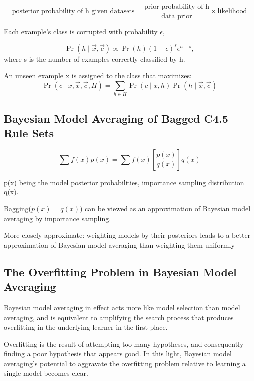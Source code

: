 \documentclass{article}
\begin{document}
\begin{equation}
    \text{posterior probability of h given datasets} = \frac{\text{prior probability of h} }{\text{data prior}}\times \text{likelihood}
\end{equation}

Each example’s class is corrupted with probability $\epsilon$,

\begin{equation}
    \operatorname{Pr}(h \mid \vec{x}, \vec{c}) \propto \operatorname{Pr}(h)(1-\epsilon)^{s} \epsilon^{n-s},
\end{equation}
where s is the number of examples correctly classiﬁed by h.

An unseen example x is assigned to the class that maximizes:
\begin{equation}
    \operatorname{Pr}(c \mid x, \vec{x}, \vec{c}, H)=\sum_{h \in H} \operatorname{Pr}(c \mid x, h) \operatorname{Pr}(h \mid \vec{x}, \vec{c})
\end{equation}

\subsection{Bayesian Model Averaging of Bagged C4.5 Rule Sets}

\begin{equation}
    \sum f(x) p(x)=\sum f(x)\left[\frac{p(x)}{q(x)}\right] q(x)
\end{equation}

p(x) being the model posterior probabilities, importance sampling distribution q(x).


Bagging($p(x) = q(x)$) can be viewed as an approximation of Bayesian model averaging by importance sampling.

More closely approximate: weighting models by their posteriors leads to a better approximation of Bayesian model averaging than weighting them uniformly


\subsection{The Overfitting Problem in Bayesian Model Averaging}

Bayesian model averaging in effect acts more like model selection than model averaging, and is equivalent to amplifying the search process that produces overﬁtting in the underlying learner in the first place.

Overfitting is the result of attempting too many hypotheses, and consequently ﬁnding a poor hypothesis that appears good. In this light, Bayesian model averaging’s potential to aggravate the overﬁtting problem relative to learning a single model becomes clear.
\end{document}
